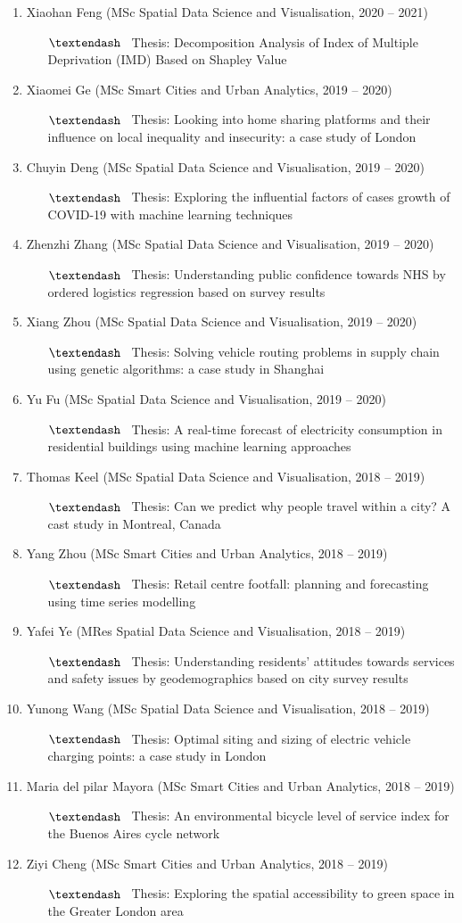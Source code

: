 \documentclass[A4,11pt]{article}
\newcommand{\MScStduentItem}[4]{
  \item #1 (#2, #3)
   \begin{itemize}
    \item[$\textendash$] \ #4
   \end{itemize}
}
\begin{document}
\begin{CJK*}{UTF8}{gbsn}
\begin{enumerate}
\begin{enumerate}
\begin{enumerate}
           \MScStduentItem{Xiaohan Feng}{MSc Spatial Data Science and Visualisation}{2020 -- 2021}
           {Thesis: Decomposition Analysis of Index of Multiple Deprivation (IMD) Based on Shapley Value}
           \MScStduentItem{Xiaomei Ge}{MSc Smart Cities and Urban Analytics}{2019 -- 2020}
           {Thesis: Looking into home sharing platforms and their influence on local inequality and insecurity: a case study of London}
           \MScStduentItem{Chuyin Deng} {MSc Spatial Data Science and Visualisation}{2019 -- 2020}
            {Thesis: Exploring the influential factors of cases growth of COVID-19 with machine learning techniques}
           \MScStduentItem{Zhenzhi Zhang}{MSc Spatial Data Science and Visualisation}{2019 -- 2020}
            {Thesis: Understanding public confidence towards NHS by ordered logistics regression based on survey results}
          \MScStduentItem{Xiang Zhou}{MSc Spatial Data Science and Visualisation}{2019 -- 2020}
           {Thesis: Solving vehicle routing problems in supply chain using genetic algorithms: a case study in Shanghai}
          \MScStduentItem{Yu Fu}{MSc Spatial Data Science and Visualisation}{2019 -- 2020}
           {Thesis: A real-time forecast of electricity consumption in residential buildings using machine learning approaches}
          \MScStduentItem{Thomas Keel}{MSc Spatial Data Science and Visualisation}{2018 -- 2019}
           {Thesis: Can we predict why people travel within a city? A cast study in Montreal, Canada}
          \MScStduentItem{Yang Zhou}{MSc Smart Cities and Urban Analytics}{2018 -- 2019}
           {Thesis: Retail centre footfall: planning and forecasting using time series modelling}
          \MScStduentItem{Yafei Ye}{MRes Spatial Data Science and Visualisation}{2018 -- 2019}
           {Thesis: Understanding residents’ attitudes towards services and safety issues by geodemographics based on city survey results}
          \MScStduentItem{Yunong Wang}{MSc Spatial Data Science and Visualisation}{2018 -- 2019}
           {Thesis: Optimal siting and sizing of electric vehicle charging points: a case study in London}
          \MScStduentItem{Maria del pilar Mayora}{MSc Smart Cities and Urban Analytics}{2018 -- 2019}
           {Thesis: An environmental bicycle level of service index for the Buenos Aires cycle network}
          \MScStduentItem{Ziyi Cheng}{MSc Smart Cities and Urban Analytics}{2018 -- 2019}
           {Thesis: Exploring the spatial accessibility to green space in the Greater London area}

       \end{enumerate}
     \end{enumerate}
\end{enumerate}  


\end{CJK*}
\end{document}
